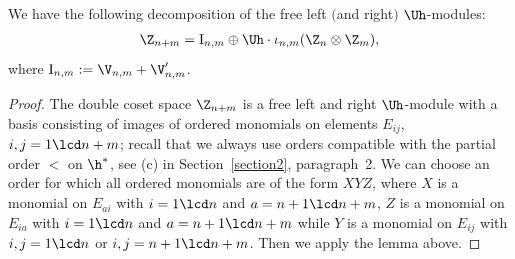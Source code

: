 \begin{cor}\label{corollary1}
We have the following decomposition of the free left $($and right$)$ $\Uh$-modules:
\begin{gather}\label{st4}
\Z_{n+m}= \mathrm{I}_{n,m}\oplus \Uh\cdot\iota_{n,m}(\Z_n\otimes\Z_m)   ,
\end{gather}
where $\mathrm{I}_{n,m}:=\V_{n,m}+\V'_{n,m}$.
\end{cor}

\begin{proof} The double coset space $\Z_{n+m}$ is a free left and right $\Uh$-module with a basis consisting of images of ordered monomials on elements
$E_{ij}$, $i,j=1\lcd n+m$; recall that we always use orders compatible with the partial order $<$ on $\h^*$, see (c) in Section~\ref{section2},
paragraph~2. We can choose an order for which all ordered monomials are of the form $XYZ$, where $X$ is a monomial on $E_{ai}$ with
$i=1\lcd n$ and $a=n+1\lcd n+m$, $Z$ is a monomial on $E_{ia}$  with $i=1\lcd n$ and $a=n+1\lcd n+m$ while $Y$ is a monomial on
$E_{ij}$ with $i,j=1\lcd n$ or $i,j=n+1\lcd n+m$. Then we apply the lemma above.
\end{proof}
